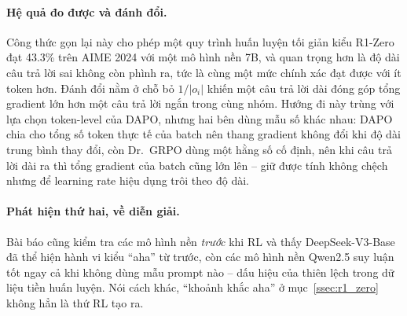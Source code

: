 \paragraph{Hệ quả đo được và đánh đổi.}
Công thức gọn lại này cho phép một quy trình huấn luyện tối giản kiểu R1-Zero đạt 43.3\% trên AIME 2024 với một mô hình nền 7B, và quan trọng hơn là độ dài câu trả lời sai không còn phình ra, tức là cùng một mức chính xác đạt được với ít token hơn. Đánh đổi nằm ở chỗ bỏ $1/|o_i|$ khiến một câu trả lời dài đóng góp tổng gradient lớn hơn một câu trả lời ngắn trong cùng nhóm. Hướng đi này trùng với lựa chọn token-level của DAPO, nhưng hai bên dùng mẫu số khác nhau: DAPO chia cho tổng số token thực tế của batch nên thang gradient không đổi khi độ dài trung bình thay đổi, còn Dr.~GRPO dùng một hằng số cố định, nên khi câu trả lời dài ra thì tổng gradient của batch cũng lớn lên -- giữ được tính không chệch nhưng để learning rate hiệu dụng trôi theo độ dài.

\paragraph{Phát hiện thứ hai, về diễn giải.}
Bài báo cũng kiểm tra các mô hình nền \emph{trước} khi RL và thấy DeepSeek-V3-Base đã thể hiện hành vi kiểu ``aha'' từ trước, còn các mô hình nền Qwen2.5 suy luận tốt ngay cả khi không dùng mẫu prompt nào -- dấu hiệu của thiên lệch trong dữ liệu tiền huấn luyện. Nói cách khác, ``khoảnh khắc aha'' ở mục~\ref{ssec:r1_zero} không hẳn là thứ RL tạo ra.

